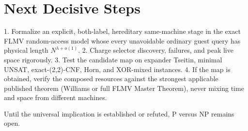 \documentclass[11pt]{article}
\begin{document}
\section{Next Decisive Steps}
1. Formalize an explicit, both-label, hereditary same-machine stage in the exact FLMV random-access model whose every unavoidable ordinary guest query has physical length \(N^{\lambda+o(1)}\).
2. Charge selector discovery, failures, and peak live space rigorously.
3. Test the candidate map on expander Tseitin, minimal UNSAT, exact-(2,2)-CNF, Horn, and XOR-mixed instances.
4. If the map is obtained, verify the composed resources against the strongest applicable published theorem (Williams or full FLMV Master Theorem), never mixing time and space from different machines.

Until the universal implication is established or refuted, P versus NP remains open.
\end{document}
